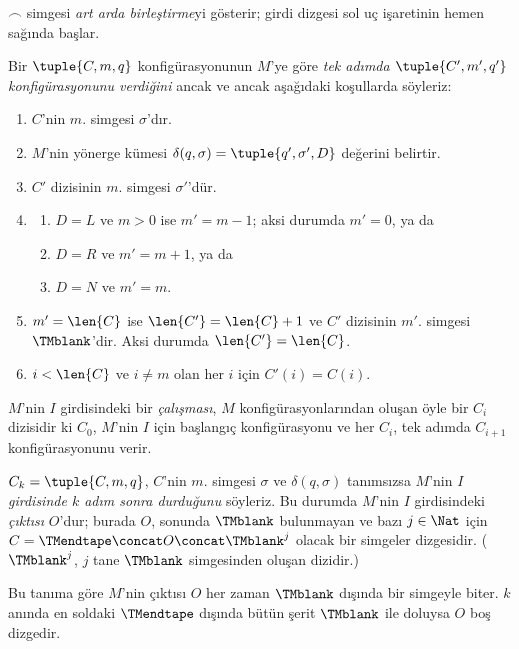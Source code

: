 \documentclass[../../../include/open-logic-section]{subfiles}
\begin{document}
\begin{explain}
$\frown$ simgesi \emph{art arda birleştirme}yi gösterir; girdi dizgesi sol
uç işaretinin hemen sağında başlar.
\end{explain}

\begin{defn}
Bir $\tuple{C,m,q}$ konfigürasyonunun $M$'ye göre
\emph{tek adımda $\tuple{C',m',q'}$ konfigürasyonunu verdiğini} ancak ve
ancak aşağıdaki koşullarda söyleriz:
\begin{enumerate}
\item $C$'nin $m$. simgesi $\sigma$'dır.
\item $M$'nin yönerge kümesi
  $\delta(q,\sigma)=\tuple{q',\sigma',D}$ değerini belirtir.
\item $C'$ dizisinin $m$. simgesi $\sigma'$'dür.
\item
  \begin{enumerate}
  \item $D=L$ ve $m>0$ ise $m'=m-1$; aksi durumda $m'=0$, ya da
  \item $D=R$ ve $m'=m+1$, ya da
  \item $D=N$ ve $m'=m$.
  \end{enumerate}
\item $m'=\len{C}$ ise $\len{C'}=\len{C}+1$ ve $C'$ dizisinin $m'$.
  simgesi $\TMblank$'dir. Aksi durumda $\len{C'}=\len{C}$.
\item $i<\len{C}$ ve $i\neq m$ olan her $i$ için $C'(i)=C(i)$.
\end{enumerate}
\end{defn}

\begin{defn}
$M$'nin $I$ girdisindeki bir \emph{çalışması}, $M$ konfigürasyonlarından
oluşan öyle bir $C_i$ dizisidir ki $C_0$, $M$'nin $I$ için başlangıç
konfigürasyonu ve her $C_i$, tek adımda $C_{i+1}$ konfigürasyonunu verir.

$C_k=\tuple{C,m,q}$, $C$'nin $m$. simgesi $\sigma$ ve
$\delta(q,\sigma)$ tanımsızsa $M$'nin \emph{$I$ girdisinde $k$ adım sonra
durduğunu} söyleriz. Bu durumda $M$'nin $I$ girdisindeki \emph{çıktısı}
$O$'dur; burada $O$, sonunda $\TMblank$ bulunmayan ve bazı $j\in\Nat$ için
$C=\TMendtape\concat O\concat\TMblank^j$ olacak bir simgeler dizgesidir.
($\TMblank^j$, $j$ tane $\TMblank$ simgesinden oluşan dizidir.)
\end{defn}

\begin{explain}
Bu tanıma göre $M$'nin çıktısı $O$ her zaman $\TMblank$ dışında bir simgeyle
biter. $k$ anında en soldaki $\TMendtape$ dışında bütün şerit $\TMblank$ ile
doluysa $O$ boş dizgedir.
\end{explain}
\end{document}
